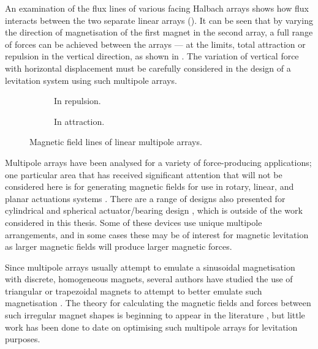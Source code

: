 \documentclass[11pt,a4paper]{memoir}
\begin{document}
An examination of the flux lines of various facing Halbach arrays shows how flux interacts between the two separate linear arrays ().
It can be seen that by varying the direction of magnetisation of the first magnet in the second array, a full range of forces can be achieved between the arrays — at the limits, total
attraction or repulsion in the vertical direction, as shown in  \resp.
The variation of vertical force with horizontal displacement must be carefully considered in the design of a levitation system using such multipole arrays.

\begin{figure}
\begin{wide}
  \begin{subfigure}
  \texttt{[image: PhD/Figures/Multipole/2-halb-repl]}
  \caption{In repulsion.}
  \end{subfigure}\hfil
\begin{subfigure}
  \texttt{[image: PhD/Figures/Multipole/2-halb-attr]}
  \caption{In attraction.}
\end{subfigure}
\end{wide}
\caption{Magnetic field lines of linear multipole arrays.}
\end{figure}

Multipole arrays have been analysed for a variety of force-producing applications; one particular area that has received significant attention that will not be considered here is for generating magnetic fields for use in rotary, linear, and planar actuations systems \parencite{marinescu1992,trumper1993-ieia-conf,cho2001,zhu2001-ipep,lee2004-mx,jang2005a,jang2005b,kimoulakis2008,lee2006-mx,min2010-ietm}.
There are a range of designs also presented for cylindrical and spherical actuator/bearing design \cite{zhu2001-ipep,yan2006-iemx,xia2008-ietm}, which is outside of the work considered in this thesis.
Some of these devices use unique multipole arrangements, and in some cases these may be of interest for magnetic levitation as larger magnetic fields will produce larger magnetic forces.

Since multipole arrays usually attempt to emulate a sinusoidal magnetisation with discrete, homogeneous magnets, several authors have studied the use of triangular or trapezoidal magnets to attempt to better emulate such magnetisation \cite{cho2001,lee2006-mx,choi2008,meessen2008-ietm,marble2008-ietm}.
The theory for calculating the magnetic fields and forces between such irregular magnet shapes is beginning to appear in the literature \cite{janssen2009-ietm}, but little work has been done to date on optimising such multipole arrays for levitation purposes.
\end{document}
